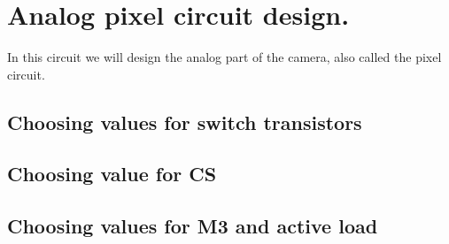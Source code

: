 \section{Analog pixel circuit design.}

In this circuit we will design the analog part of the camera, also called the pixel circuit.

\subsection{Choosing values for switch transistors}

\subsection{Choosing value for CS}

\subsection{Choosing values for M3 and active load}
